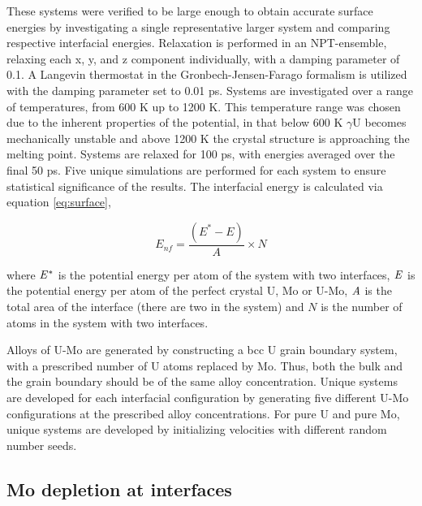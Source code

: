 \documentclass[review]{elsarticle}
\begin{document}
These systems were verified to be large enough to obtain accurate surface energies by investigating a single representative larger system and comparing respective interfacial energies. Relaxation is performed in an NPT-ensemble, relaxing each x, y, and z component individually, with a damping parameter of 0.1. A Langevin thermostat in the Gronbech-Jensen-Farago \cite{gjf2014} formalism is utilized with the damping parameter set to 0.01 ps. Systems are investigated over a range of temperatures, from 600 K up to 1200 K. This temperature range was chosen due to the inherent properties of the potential, in that below 600 K $\gamma$U becomes mechanically unstable and above 1200 K the crystal structure is approaching the melting point. Systems are relaxed for 100 ps, with energies averaged over the final 50 ps. Five unique simulations are performed for each system to ensure statistical significance of the results. The interfacial energy is calculated via equation \ref{eq:surface},

\begin{equation}
\label{eq:surface}
E_{nf}= \frac{(E^{*} - E)}{A} \times N
\end{equation}

where $\it{E^{*}}$ is the potential energy per atom of the system with two interfaces, $\it{E}$ is the potential energy per atom of the perfect crystal U, Mo or U-Mo, $\it{A}$ is the total area of the interface (there are two in the system) and $\textit{N}$ is the number of atoms in the system with two interfaces. 

Alloys of U-Mo are generated by constructing a bcc U grain boundary system, with a prescribed number of U atoms replaced by Mo. Thus, both the bulk and the grain boundary should be of the same alloy concentration. Unique systems are developed for each interfacial configuration by generating five different U-Mo configurations at the prescribed alloy concentrations. For pure U and pure Mo, unique systems are developed by initializing velocities with different random number seeds. 

\subsection{Mo depletion at interfaces}
\end{document}
